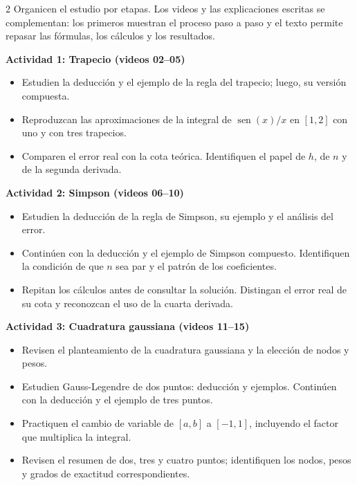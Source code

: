 \documentclass[10pt,letterpaper]{article}
\begin{document}
\begin{multicols}{2}
Organicen el estudio por etapas. Los videos y las explicaciones escritas se complementan: los primeros muestran el proceso paso a paso y el texto permite repasar las fórmulas, los cálculos y los resultados.

{\color{actividades}\textbf{Actividad 1: Trapecio (videos 02--05)}}
\begin{itemize}
\item Estudien la deducción y el ejemplo de la regla del trapecio; luego, su versión compuesta.
\item Reproduzcan las aproximaciones de la integral de $\operatorname{sen}(x)/x$ en $[1,2]$ con uno y con tres trapecios.
\item Comparen el error real con la cota teórica. Identifiquen el papel de $h$, de $n$ y de la segunda derivada.
\end{itemize}

{\color{actividades}\textbf{Actividad 2: Simpson (videos 06--10)}}
\begin{itemize}
\item Estudien la deducción de la regla de Simpson, su ejemplo y el análisis del error.
\item Continúen con la deducción y el ejemplo de Simpson compuesto. Identifiquen la condición de que $n$ sea par y el patrón de los coeficientes.
\item Repitan los cálculos antes de consultar la solución. Distingan el error real de su cota y reconozcan el uso de la cuarta derivada.
\end{itemize}

\columnbreak
{\color{actividades}\textbf{Actividad 3: Cuadratura gaussiana (videos 11--15)}}
\begin{itemize}
\item Revisen el planteamiento de la cuadratura gaussiana y la elección de nodos y pesos.
\item Estudien Gauss-Legendre de dos puntos: deducción y ejemplos. Continúen con la deducción y el ejemplo de tres puntos.
\item Practiquen el cambio de variable de $[a,b]$ a $[-1,1]$, incluyendo el factor que multiplica la integral.
\item Revisen el resumen de dos, tres y cuatro puntos; identifiquen los nodos, pesos y grados de exactitud correspondientes.
\end{itemize}


\end{multicols}
\end{document}
